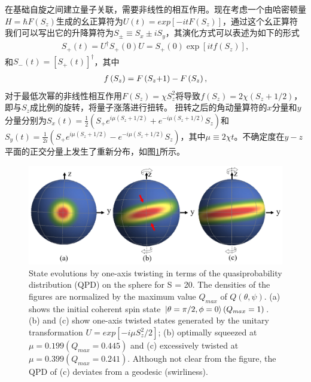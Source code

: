 在基础自旋之间建立量子关联，需要非线性的相互作用。现在考虑一个由哈密顿量$H=\hbar F(S_z)$生成的幺正算符为$U(t)=exp[-itF(S_z)]$，通过这个幺正算符我们可以写出它的升降算符为${S_ \pm } \equiv {S_x} \pm i{S_y}$，其演化方式可以表述为如下的形式
\begin{align}
	{S_ + }\left( t \right) = {U^\dag }{S_ + }\left( 0 \right)U = {S_ + }\left( 0 \right)\exp \left[ {itf\left( {{S_z}} \right)} \right],\label{eq3336}
\end{align}
和${S_-}\left( t \right) = {\left[ {{S_ + }\left( t \right)} \right]^\dag }$，其中
\begin{align}
	f\left( {{S_z}} \right) = F\left( {{S_z}{\rm{ + }}1} \right) - F\left( {{S_z}} \right),\label{eq3337}
\end{align}
对于最低次幂的非线性相互作用$F(S_z)=\chi S_z^2$将导致$f(S_z) = 2\chi (S_z+1/2)$，即与$S_z$成比例的旋转，将量子涨落进行扭转。
扭转之后的角动量算符的$x$分量和$y$分量分别为${S_x}(t)= \frac12(S_+e^{i\mu(S_z+1/2)}+e^{-i\mu(S_z+1/2)}S_z)$和${S_y}(t)= \frac{1}{2i}(S_+e^{i\mu(S_z+1/2)}-e^{-i\mu(S_z+1/2)}S_z)$，其中$\mu  \equiv 2\chi t$。不确定度在$y-z$平面的正交分量上发生了重新分布，如图\ref{figure5}所示。
\begin{figure}[h!]
	\centering
	\includegraphics[scale=0.42]{Img/oat2.png}
	{State evolutions by one-axis twisting in terms of the quasiprobability distribution (QPD) on the sphere for S = 20. The densities of the figures are normalized by the maximum value $Q_{max}$ of $Q(\theta,\psi)$. (a) shows the initial coherent spin state $\ket{\theta=\pi/2,\phi=0}(Q_{max}=1)$. (b) and (c) show one-axis twisted states generated by the unitary transformation $U=exp[-i\mu S_z^2/2]$; (b) optimally squeezed at $\mu=0.199(Q_{max}=0.445)$ and (c) excessively twisted at $\mu=0.399(Q_{max}=0.241)$. Although not clear from the figure, the QPD of (c) deviates from a geodesic (swirliness).}
	\label{figure5}
\end{figure}

